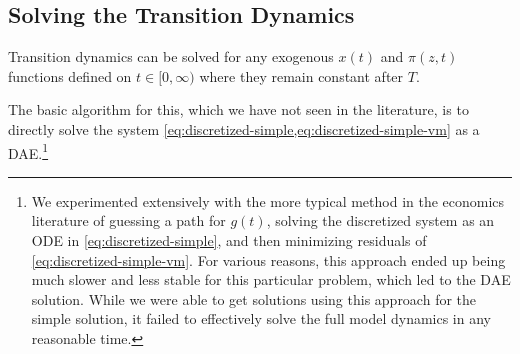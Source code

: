 \documentclass[11pt]{article}
\begin{document}
\subsection{Solving the Transition Dynamics}

Transition dynamics can be solved for any exogenous $x(t)$ and $\pi(z,t)$ functions defined on $t \in [0,\infty)$ where they remain constant after $T$.

The basic algorithm for this, which we have not seen in the literature, is to directly solve the system \cref{eq:discretized-simple,eq:discretized-simple-vm} as a DAE.\footnote{ We experimented extensively with the more typical method in the economics literature of guessing a path for $g(t)$, solving the discretized system as an ODE in \cref{eq:discretized-simple}, and then minimizing residuals of \cref{eq:discretized-simple-vm}.  For various reasons, this approach ended up being much slower and less stable for this particular problem, which led to the DAE solution.  While we were able to get solutions using this approach for the simple solution, it failed to effectively solve the full model dynamics in any reasonable time.}
\end{document}
